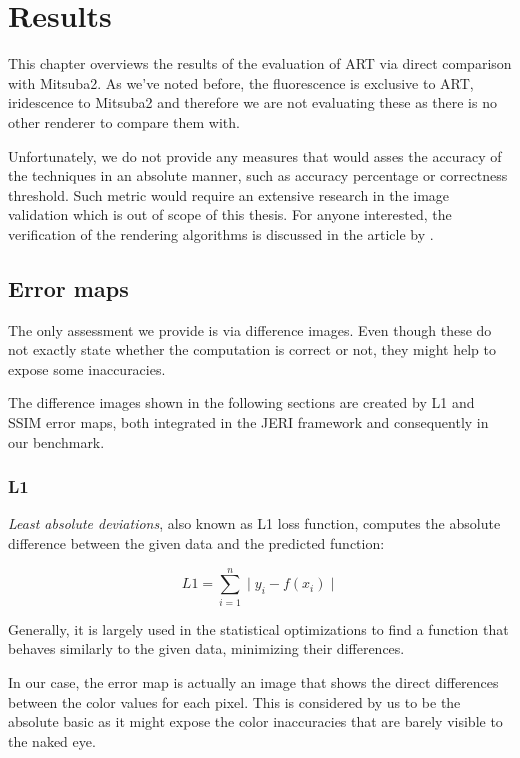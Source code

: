 \chapter{Results}
\label{chap:results}

This chapter overviews the results of the evaluation of ART via direct comparison with Mitsuba2. As we've noted before, the fluorescence is exclusive to ART, iridescence to Mitsuba2 and therefore we are not evaluating these as there is no other renderer to compare them with.

Unfortunately, we do not provide any measures that would asses the accuracy of the techniques in an absolute manner, such as accuracy percentage or correctness threshold. Such metric would require an extensive research in the image validation which is out of scope of this thesis. For anyone interested, the verification of the rendering algorithms is discussed in the article by \citet{ulbricht2006verification}.

\section{Error maps}

The only assessment we provide is via difference images. Even though these do not exactly state whether the computation is correct or not, they might help to expose some inaccuracies.

The difference images shown in the following sections are created by L1 and SSIM error maps, both integrated in the JERI framework and consequently in our benchmark. 

\subsection{L1}

\emph{Least absolute deviations}, also known as L1 loss function, computes the absolute difference between the given data and the predicted function:

\begin{equation}
L1=\sum_{i=1}^{n}\mid y_i - f(x_i) \mid
\end{equation}

Generally, it is largely used in the statistical optimizations to find a function that behaves similarly to the given data, minimizing their differences.

In our case, the error map is actually an image that shows the direct differences between the color values for each pixel. This is considered by us to be the absolute basic as it might expose the color inaccuracies that are barely visible to the naked eye.

